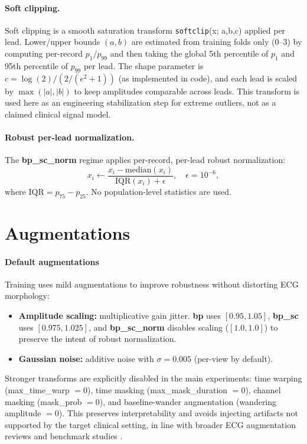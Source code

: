 \paragraph{Soft clipping.}
Soft clipping is a smooth saturation transform \texttt{softclip}(x; a,b,c) applied per lead.
Lower/upper bounds $(a,b)$ are estimated from training folds only (0--3) by computing per-record $p_1/p_{99}$ and then taking the global 5th percentile of $p_1$ and 95th percentile of $p_{99}$ per lead.
The shape parameter is $c=\log(2)/\left(2/(e^2+1)\right)$ (as implemented in code), and each lead is scaled by $\max(|a|,|b|)$ to keep amplitudes comparable across leads.
This transform is used here as an engineering stabilization step for extreme outliers, not as a claimed clinical signal model.

\paragraph{Robust per-lead normalization.}
The \textbf{bp\_sc\_norm} regime applies per-record, per-lead robust normalization:
\[
  x_i \leftarrow \frac{x_i - \mathrm{median}(x_i)}{\mathrm{IQR}(x_i) + \epsilon}, \quad \epsilon=10^{-6},
\]
where $\mathrm{IQR} = p_{75}-p_{25}$. No population-level statistics are used.

\section{Augmentations}
\paragraph*{Default augmentations}
Training uses mild augmentations to improve robustness without distorting ECG morphology:
\begin{itemize}
  \item \textbf{Amplitude scaling:} multiplicative gain jitter. \textbf{bp} uses $[0.95,1.05]$, \textbf{bp\_sc} uses $[0.975,1.025]$, and \textbf{bp\_sc\_norm} disables scaling ($[1.0,1.0]$) to preserve the intent of robust normalization.
  \item \textbf{Gaussian noise:} additive noise with $\sigma=0.005$ (per-view by default).
\end{itemize}
Stronger transforms are explicitly disabled in the main experiments: time warping (max\_time\_warp $=0$), time masking (max\_mask\_duration $=0$), channel masking (mask\_prob $=0$), and baseline-wander augmentation (wandering amplitude $=0$). This preserves interpretability and avoids injecting artifacts not supported by the target clinical setting, in line with broader ECG augmentation reviews and benchmark studies \parencite{rahman_ecg_augmentation_survey_2023,qiu_augmentation_2022}.

